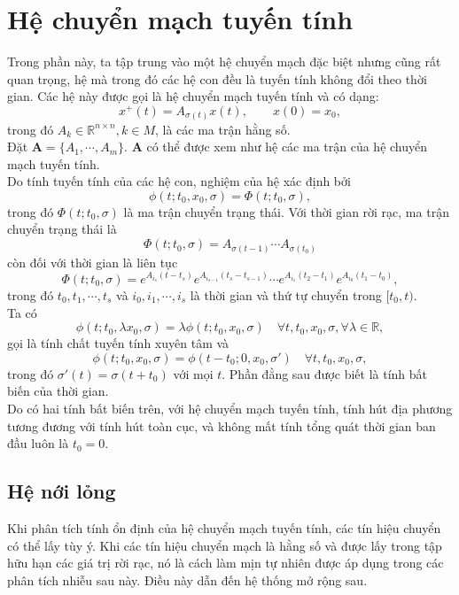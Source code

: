 \documentclass[14pt,a4paper,oneside]{report}		%
\begin{document}
\section{Hệ chuyển mạch tuyến tính}
Trong phần này, ta tập trung vào một hệ chuyển mạch đặc biệt nhưng cũng rất quan trọng, hệ mà trong đó các hệ con đều là tuyến tính không đổi theo thời gian. Các hệ này được gọi là hệ chuyển mạch tuyến tính và có dạng:
\begin{equation} \label{eq2-16}
x^+(t) = A_{\sigma (t)}x(t), \qquad x(0) = x_0,
\end{equation}
trong đó $A_k\in\mathbb{R}^{n\times n}, k\in M$, là các ma trận hằng số.\\

Đặt $\mathbf{A} = \{A_1,\cdots,A_m\}$. $\mathbf{A}$ có thể được xem như hệ các ma trận của hệ chuyển mạch tuyến tính. \\
Do tính tuyến tính của các hệ con, nghiệm của hệ xác định bởi
\begin{equation} \label{eq2-17}
\phi (t;t_0,x_0,\sigma)=\Phi (t;t_0,\sigma),
\end{equation}
trong đó $\Phi (t;t_0,\sigma)$ là ma trận chuyển trạng thái. Với thời gian rời rạc, ma trận chuyển trạng thái là
$$\Phi (t;t_0,\sigma)=A_{\sigma (t-1)}\cdots A_{\sigma (t_0)}$$
còn đối với thời gian là liên tục
$$\Phi (t;t_0,\sigma )=e^{A_{i_s}(t-t_s)}e^{A_{i_{s-1}}(t_s-t_{s-1})}\cdots e^{A_{i_1}(t_2-t_1)}e^{A_{i_0}(t_1-t_0)},$$
trong đó $t_0,t_1,\cdots ,t_s$ và $i_0,i_1,\cdots,i_s$ 
là thời gian và thứ tự chuyển trong $[t_0,t)$.\\

Ta có
\begin{equation} \label{eq2-18}
\phi (t;t_0,\lambda x_0,\sigma) = \lambda \phi (t;t_0,x_0,\sigma)\quad \forall t,t_0,x_0,\sigma , \forall \lambda\in\mathbb{R},
\end{equation}
gọi là tính chất tuyến tính xuyên tâm và
\begin{equation} \label{eq2-19}
\phi (t;t_0,x_0,\sigma) = \phi (t-t_0;0,x_0,\sigma')\quad \forall t,t_0,x_0,\sigma,
\end{equation}
trong đó $\sigma'(t)=\sigma(t+t_0)$ với mọi $t$. Phần đằng sau được biết là tính bất biến của thời gian.\\

Do có hai tính bất biến trên, với hệ chuyển mạch tuyến tính, tính hút địa phương tương đương với tính hút toàn cục, và không mất tính tổng quát thời gian ban đầu luôn là $t_0 = 0$.

\subsection{Hệ nới lỏng}
Khi phân tích tính ổn định của hệ chuyển mạch tuyến tính, các tín hiệu chuyển có thể lấy tùy ý. Khi các tín hiệu chuyển mạch là hằng số và được lấy trong tập hữu hạn các giá trị rời rạc, nó là cách làm mịn tự nhiên được áp dụng trong các phân tích nhiễu sau này. Điều này dẫn đến hệ thống mở rộng sau.\\
\end{document}
